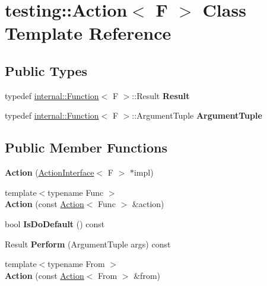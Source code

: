 \hypertarget{classtesting_1_1Action}{}\section{testing\+:\+:Action$<$ F $>$ Class Template Reference}
\label{classtesting_1_1Action}
\subsection*{Public Types}
\begin{DoxyCompactItemize}
\item 
\mbox{\label{classtesting_1_1Action_a9af08a21ad329331fde856cba9b6dea2}} 
typedef \hyperlink{structtesting_1_1internal_1_1Function}{internal\+::\+Function}$<$ F $>$\+::Result {\bfseries Result}
\item 
\mbox{\label{classtesting_1_1Action_ae27fda510696a9294f991de5b1abfaf2}} 
typedef \hyperlink{structtesting_1_1internal_1_1Function}{internal\+::\+Function}$<$ F $>$\+::Argument\+Tuple {\bfseries Argument\+Tuple}
\end{DoxyCompactItemize}
\subsection*{Public Member Functions}
\begin{DoxyCompactItemize}
\item 
\mbox{\label{classtesting_1_1Action_a5ce44c673e3f91378777b954d88917cd}} 
{\bfseries Action} (\hyperlink{classtesting_1_1ActionInterface}{Action\+Interface}$<$ F $>$ $\ast$impl)
\item 
\mbox{\label{classtesting_1_1Action_a806bacddaa1f1daf61f89674564bdf0f}} 
{\footnotesize template$<$typename Func $>$ }\\{\bfseries Action} (const \hyperlink{classtesting_1_1Action}{Action}$<$ Func $>$ \&action)
\item 
\mbox{\label{classtesting_1_1Action_a4468ca2ea5e9f7363271145992d09dba}} 
bool {\bfseries Is\+Do\+Default} () const
\item 
\mbox{\label{classtesting_1_1Action_a5489a68def1d82eb61df819eae52dc8f}} 
Result {\bfseries Perform} (Argument\+Tuple args) const
\item 
\mbox{\label{classtesting_1_1Action_af23eef2fff5a92d8ff2ed7ac7a542005}} 
{\footnotesize template$<$typename From $>$ }\\{\bfseries Action} (const \hyperlink{classtesting_1_1Action}{Action}$<$ From $>$ \&from)
\end{DoxyCompactItemize}
